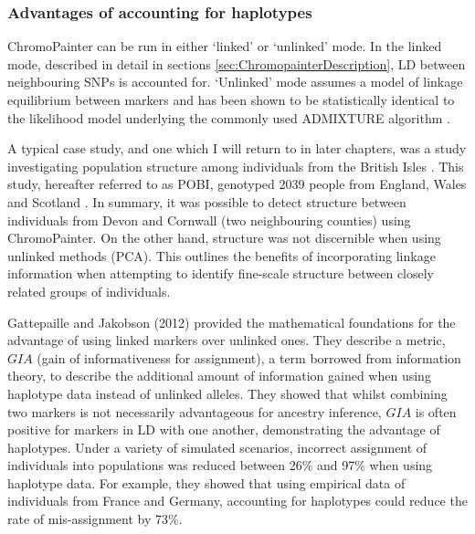 \subsubsection{Advantages of accounting for haplotypes}

ChromoPainter can be run in either `linked' or `unlinked' mode. In the linked mode, described in detail in sections \ref{sec:ChromopainterDescription}, LD between neighbouring SNPs is accounted for. `Unlinked' mode assumes a model of linkage equilibrium between markers and has been shown to be statistically identical to the likelihood model underlying the commonly used ADMIXTURE algorithm \cite{Lawson2012}.

A typical case study, and one which I will return to in later chapters, was a study investigating population structure among individuals from the British Isles \cite{Leslie2015}. This study, hereafter referred to as POBI, genotyped 2039 people from England, Wales and Scotland \cite{Leslie2015}. In summary, it was possible to detect structure between individuals from Devon and Cornwall (two neighbouring counties) using ChromoPainter. On the other hand, structure was not discernible when using unlinked methods (PCA). This outlines the benefits of incorporating linkage information when attempting to identify fine-scale structure between closely related groups of individuals.

Gattepaille and Jakobson (2012) \cite{JakobssonCombiningMarkers} provided the mathematical foundations for the advantage of using linked markers over unlinked ones. They describe a metric, $GIA$ (gain of informativeness for assignment), a term borrowed from information theory, to describe the additional amount of information gained when using haplotype data instead of unlinked alleles. They showed that whilst combining two markers is not necessarily advantageous for ancestry inference, $GIA$ is often positive for markers in LD with one another, demonstrating the advantage of haplotypes. Under a variety of simulated scenarios, incorrect assignment of individuals into populations was reduced between 26\% and 97\% when using haplotype data. For example, they showed that using empirical data of individuals from France and Germany, accounting for haplotypes could reduce the rate of mis-assignment by 73\%. 

